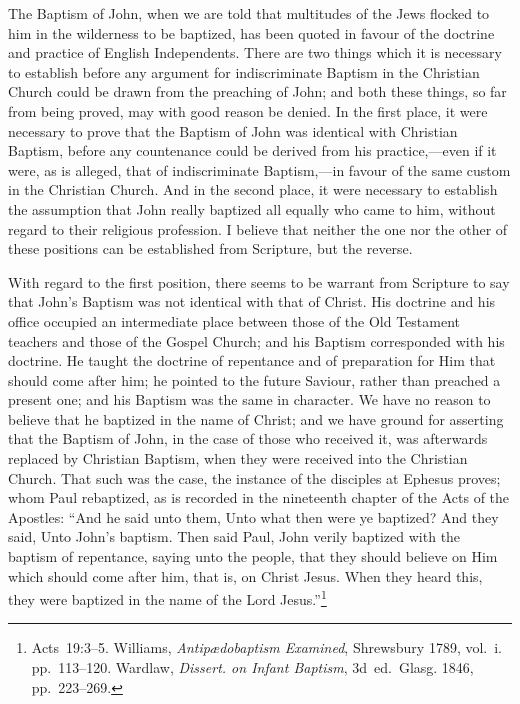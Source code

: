 \documentclass[
  english,
]{book}
\begin{document}
The Baptism of John, when we are told that multitudes of the Jews flocked to him in the wilderness to be baptized, has been quoted in favour of the doctrine and practice of English Independents. There are two things which it is necessary to establish before any argument for indiscriminate Baptism in the Christian Church could be drawn from the preaching of John; and both these things, so far from being proved, may with good reason be denied. In the first place, it were necessary to prove that the Baptism of John was identical with Christian Baptism, before any countenance could be derived from his practice,---even if it were, as is alleged, that of indiscriminate Baptism,---in favour of the same custom in the Christian Church. And in the second place, it were necessary to establish the assumption that John really baptized all equally who came to him, without regard to their religious profession. I believe that neither the one nor the other of these positions can be established from Scripture, but the reverse.

With regard to the first position, there seems to be warrant from Scripture to say that John's Baptism was not identical with that of Christ. His doctrine and his office occupied an intermediate place between those of the Old Testament teachers and those of the Gospel Church; and his Baptism corresponded with his doctrine. He taught the doctrine of repentance and of preparation for Him that should come after him; he pointed to the future Saviour, rather than preached a present one; and his Baptism was the same in character. We have no reason to believe that he baptized in the name of Christ; and we have ground for asserting that the Baptism of John, in the case of those who received it, was afterwards replaced by Christian Baptism, when they were received into the Christian Church. That such was the case, the instance of the disciples at Ephesus proves; whom Paul rebaptized, as is recorded in the nineteenth chapter of the Acts of the Apostles: ``And he said unto them, Unto what then were ye baptized? And they said, Unto John's baptism. Then said Paul, John verily baptized with the baptism of repentance, saying unto the people, that they should believe on Him which should come after him, that is, on Christ Jesus. When they heard this, they were baptized in the name of the Lord Jesus.''\footnote{Acts~19:3--5. Williams, \emph{Antipædobaptism Examined}, Shrewsbury 1789, vol.~i. pp.~113--120. Wardlaw, \emph{Dissert. on Infant Baptism}, 3d~ed.~Glasg. 1846, pp.~223--269.}
\end{document}
